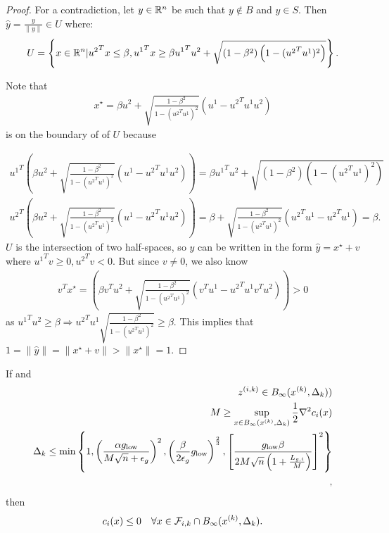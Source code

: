 \begin{proof}
For a contradiction, let $y \in {\mathbb R^{n}}$ be such that $y \not \in B$ and $y \in S$.
Then $\hat y = \frac{y}{\|y\|} \in U$ where:
\begin{align*}
U = \left\{x \in {\mathbb R^{n}} | {u^2}^Tx \le \beta, {u^1}^Tx \ge \beta {u^1}^Tu^2 + \sqrt{(1 - \beta^2)\left(1 - ({u^2}^Tu^1)^2\right)} \right\}.
\end{align*}

Note that
\begin{align*}
x^{\star} = \beta u^2 + \sqrt{\frac{1 - \beta^2}{1 - ({u^2}^Tu^1)^2}} (u^1 - {u^2}^Tu^1 u^2 )
\end{align*}
is on the boundary of of $U$ because

\begin{align*}
{u^1}^T\left(\beta u^2 + \sqrt{\frac{1 - \beta^2}{1 - ({u^2}^Tu^1)^2}} (u^1 - {u^2}^Tu^1 u^2 )\right) = 
\beta {u^1}^Tu^2 + \sqrt{(1 - \beta^2)\left(1 - ({u^2}^Tu^1)^2\right)} \\
{u^2}^T\left(\beta u^2 + \sqrt{\frac{1 - \beta^2}{1 - ({u^2}^Tu^1)^2}} (u^1 - {u^2}^Tu^1 u^2 )\right) = 
\beta + \sqrt{\frac{1 - \beta^2}{1 - ({u^2}^Tu^1)^2}} ({u^2}^Tu^1 - {u^2}^Tu^1 ) = \beta.
\end{align*}
$U$ is the intersection of two half-spaces, so $\hat y$ can be written in the form $\hat y = x^{\star} + v$ where ${u^1}^Tv \ge 0, {u^2}^Tv < 0$.
But since $v \ne 0$, we also know
\begin{align*}
{v}^Tx^{\star} = 
\left(\beta {v}^Tu^2 + \sqrt{\frac{1 - \beta^2}{1 - ({u^2}^Tu^1)^2}} ({v}^Tu^1 - {u^2}^Tu^1 {v}^Tu^2 )\right) > 0
\end{align*}
as ${u^1}^Tu^2 \ge \beta \Longrightarrow {u^2}^Tu^1\sqrt{\frac{1 - \beta^2}{1 - ({u^2}^Tu^1)^2}} \ge \beta$.
This implies that $1 = \|\hat y\| = \|x^{\star} + v\| > \|x^{\star}\| = 1$.
\end{proof}






\begin{theorem}
If and
\begin{align*}
z^{(i, k)} \in B_{\infty}({x^{(k)}}, \Delta_k)) \\
M \ge \sup_{x \in B_{\infty}({x^{(k)}}, \Delta_k)} \frac 1 2 \nabla^2 c_i(x) \\
\Delta_k \le \min\left\{
1,
\left(\frac{\alpha g_{\text{low}}}{M \sqrt{n} + \epsilon_g}\right)^2,
\left(\frac{\beta}{2\epsilon_{g}}g_{\text{low}}\right)^{\frac 2 3},
\left[\frac {g_{\text{low}} \beta} {2M\sqrt{n}\left(1 + \frac {{L_{g, i}}} M \right)} \right]^2
\right\} \\
,
\end{align*} then
\begin{align*}
c_i(x) \le 0 \quad \forall x \in {\mathcal F_{i, k}} \cap B_{\infty}({x^{(k)}}, \Delta_k).
\end{align*}

\end{theorem}

